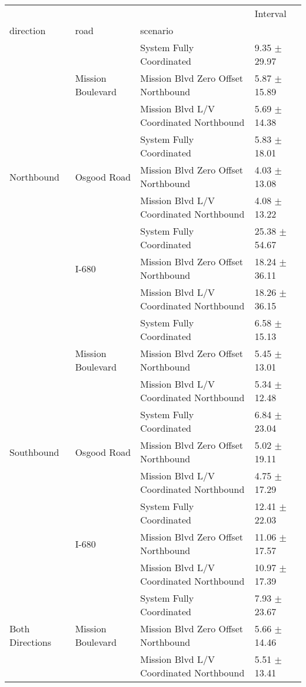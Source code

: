 \begin{tabular}{llll}
\toprule
 &  &  & Interval \\
direction & road & scenario &  \\
\midrule
\multirow[t]{9}{*}{Northbound} & \multirow[t]{3}{*}{Mission Boulevard} & System Fully Coordinated & 9.35 $\pm$ 29.97 \\
 &  & Mission Blvd Zero Offset Northbound & 5.87 $\pm$ 15.89 \\
 &  & Mission Blvd L/V Coordinated Northbound & 5.69 $\pm$ 14.38 \\
 & \multirow[t]{3}{*}{Osgood Road} & System Fully Coordinated & 5.83 $\pm$ 18.01 \\
 &  & Mission Blvd Zero Offset Northbound & 4.03 $\pm$ 13.08 \\
 &  & Mission Blvd L/V Coordinated Northbound & 4.08 $\pm$ 13.22 \\
 & \multirow[t]{3}{*}{I-680} & System Fully Coordinated & 25.38 $\pm$ 54.67 \\
 &  & Mission Blvd Zero Offset Northbound & 18.24 $\pm$ 36.11 \\
 &  & Mission Blvd L/V Coordinated Northbound & 18.26 $\pm$ 36.15 \\
\multirow[t]{9}{*}{Southbound} & \multirow[t]{3}{*}{Mission Boulevard} & System Fully Coordinated & 6.58 $\pm$ 15.13 \\
 &  & Mission Blvd Zero Offset Northbound & 5.45 $\pm$ 13.01 \\
 &  & Mission Blvd L/V Coordinated Northbound & 5.34 $\pm$ 12.48 \\
 & \multirow[t]{3}{*}{Osgood Road} & System Fully Coordinated & 6.84 $\pm$ 23.04 \\
 &  & Mission Blvd Zero Offset Northbound & 5.02 $\pm$ 19.11 \\
 &  & Mission Blvd L/V Coordinated Northbound & 4.75 $\pm$ 17.29 \\
 & \multirow[t]{3}{*}{I-680} & System Fully Coordinated & 12.41 $\pm$ 22.03 \\
 &  & Mission Blvd Zero Offset Northbound & 11.06 $\pm$ 17.57 \\
 &  & Mission Blvd L/V Coordinated Northbound & 10.97 $\pm$ 17.39 \\
\multirow[t]{9}{*}{Both Directions} & \multirow[t]{3}{*}{Mission Boulevard} & System Fully Coordinated & 7.93 $\pm$ 23.67 \\
 &  & Mission Blvd Zero Offset Northbound & 5.66 $\pm$ 14.46 \\
 &  & Mission Blvd L/V Coordinated Northbound & 5.51 $\pm$ 13.41 \\

\end{tabular}
